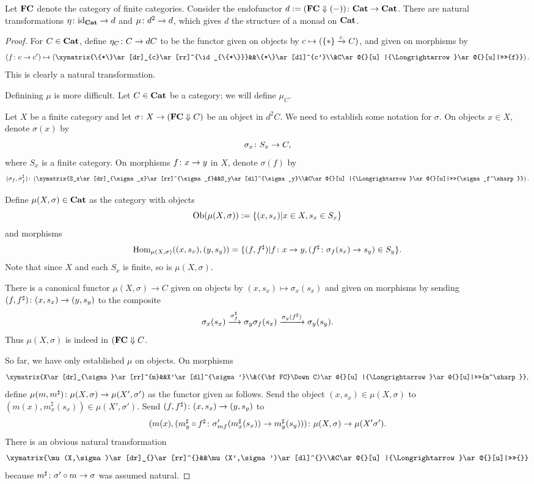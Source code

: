\documentclass{amsart}
\makeatletter
\newcommand{\TriRight}[7]{\xymatrix{#1\ar[dr]_{#2}\ar[rr]^{#3}&&#4\ar[dl]^{#5}\\&#6\ar@{}[u] |{\Longrightarrow}\ar@{}[u]|>>>>{#7}}}
\def\FC{{\bf FC}}
\makeatother
\begin{document}
\begin{lemma}\label{fc down is monad}

Let $\FC$ denote the category of finite categories.  Consider the endofunctor $d:=(\FC\Down(-))\taking\Cat\to\Cat$.  There are natural transformations $\eta\colon\textnormal{id}_{\bf Cat}\rightarrow d$ and $\mu\colon d^2\rightarrow d$, which gives $d$ the structure of a monad on ${\bf Cat}$.  

\end{lemma}

\begin{proof}

For $C\in{\bf Cat}$, define $\eta_C\colon C\rightarrow dC$ to be the functor given on objects by $c\mapsto (\{*\}\xrightarrow{c}C)$, and given on morphisms by $$(f\taking c\to c')\mapsto\left(\TriRight{\{*\}}{c}{\id_{\{*\}}}{\{*\}}{c'}{C}{f}\right).$$  This is clearly a natural transformation.

Definining $\mu$ is more difficult.  Let $C\in{\bf Cat}$ be a category; we will define $\mu_C$.

Let $X$ be a finite category and let $\sigma\taking X\to(\FC\Down C)$ be an object in $d^2C$.  We need to establish some notation for $\sigma$.  On objects $x\in X$, denote $\sigma(x)$ by $$\sigma_x\colon S_x\rightarrow C,$$ where $S_x$ is a finite category.  On morphisms $f\colon x\rightarrow y$ in $X$, denote $\sigma(f)$ by $$(\sigma_f,\sigma_f^\sharp)\taking\left(\TriRight{S_x}{\sigma_x}{\sigma_f}{S_y}{\sigma_y}{C}{\sigma_f^\sharp}\right).$$

Define $\mu(X,\sigma)\in{\bf Cat}$ as the category with objects $$\textnormal{Ob}(\mu(X,\sigma)):=\{(x,s_x)|x\in X,s_x\in S_x\}$$ and morphisms $$\textnormal{Hom}_{\mu(X,\sigma)}((x,s_x),(y,s_y))=\{(f,f^\sharp)|f\colon x\rightarrow y, (f^\sharp\colon\sigma_f(s_x)\rightarrow s_y)\in S_y\}.$$  Note that since $X$ and each $S_x$ is finite, so is $\mu(X,\sigma)$.  

There is a canonical functor $\mu(X,\sigma)\to C$ given on objects by $(x,s_x)\mapsto\sigma_x(s_x)$ and given on morphisms by sending $(f,f^\sharp)\colon(x,s_x)\rightarrow(y,s_y)$ to the composite $$\sigma_x(s_x)\xrightarrow{\sigma_f^\sharp}\sigma_y\sigma_f(s_x)\xrightarrow{\sigma_y(f^\sharp)}\sigma_y(s_y).$$  Thus $\mu(X,\sigma)$ is indeed in $(\FC\Down C$.

So far, we have only established $\mu$ on objects.  On morphisms $$\TriRight{X}{\sigma}{m}{X'}{\sigma'}{(\FC\Down C)}{m^\sharp},$$ define $\mu(m,m^\sharp)\colon\mu(X,\sigma)\rightarrow\mu(X',\sigma')$ as the functor given as follows.  Send the object $(x,s_x)\in\mu(X,\sigma)$ to $(m(x),m^\sharp_x(s_x))\in\mu(X',\sigma')$.  Send $(f,f^\sharp)\colon(x,s_x)\rightarrow(y,s_y)$ to $$(m(x),(m_y^\sharp\circ f^\sharp\colon\sigma'_{mf}(m_x^\sharp(s_x))\rightarrow m_y^\sharp(s_y)))\colon\mu(X,\sigma)\rightarrow\mu(X'\sigma').$$  There is an obvious natural transformation $$\TriRight{\mu(X,\sigma)}{}{}{\mu(X',\sigma')}{}{C}{}$$ because $m^\sharp\colon\sigma'\circ m\rightarrow \sigma$ was assumed natural.  


\end{proof}
\end{document}
